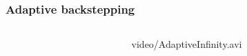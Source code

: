 %
\begin{frame}
\frametitle{Adaptive backstepping}
%
\begin{columns}
\begin{column}{0.4\textwidth}
\end{column}
\begin{column}{0.6\textwidth}
	\begin{center}
		{video/AdaptiveInfinity.avi}
	\end{center}
\end{column}
\end{columns}
\end{frame}
%
